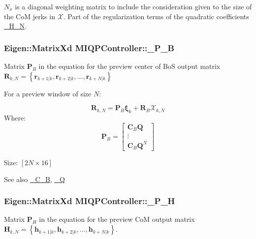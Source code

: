 $N_x$ is a diagonal weighting matrix to include the consideration given to the size of the \-Co\-M jerks in $\mathcal{X}$. \-Part of the regularization terms of the quadratic coefficients \hyperlink{classMIQPController_ab4b99d844add54fa7ad6ca6b80cab089}{\-\_\-\-H\-\_\-\-N}. \hypertarget{classMIQPController_a848852d659dff4a566a8dca57819587d}{
\subsubsection[{\-\_\-\-P\-\_\-\-B}]{\setlength{\rightskip}{0pt plus 5cm}\-Eigen\-::\-Matrix\-Xd {\bf \-M\-I\-Q\-P\-Controller\-::\-\_\-\-P\-\_\-\-B}}}\label{classMIQPController_a848852d659dff4a566a8dca57819587d}
\-Matrix $\mathbf{P}_B$ in the equation for the preview center of \-Bo\-S output matrix $\mathbf{R}_{k,N} = \left\{ \mathbf{r}_{k+1|k}, \mathbf{r}_{k+2|k}, \dots, \mathbf{r}_{k+N|k} \right\}$

\-For a preview window of size $N$\-:

\[ \mathbf{R}_{k,N} = \mathbf{P}_B \mathbf{\xi}_k + \mathbf{R}_B \mathcal{X}_{k,N} \] \-Where\-: \[ \mathbf{P}_B = \left[\begin{array}{c} \mathbf{C}_B \mathbf{Q} \\ \vdots\\ \mathbf{C}_B \mathbf{Q}^N \end{array}\right] \]

\-Size\-: $[2N\times16]$

\begin{DoxySeeAlso}{\-See also}
\hyperlink{classMIQPController_a5c6882cb248e9d16513868fea7835d6e}{\-\_\-\-C\-\_\-\-B}, \hyperlink{classMIQPController_ac6404f74d6002d6a0ca4bd2d0b41d548}{\-\_\-\-Q} 
\end{DoxySeeAlso}
\hypertarget{classMIQPController_afb83c4fddc4adba989506ccc9b62ff1e}{
\subsubsection[{\-\_\-\-P\-\_\-\-H}]{\setlength{\rightskip}{0pt plus 5cm}\-Eigen\-::\-Matrix\-Xd {\bf \-M\-I\-Q\-P\-Controller\-::\-\_\-\-P\-\_\-\-H}}}\label{classMIQPController_afb83c4fddc4adba989506ccc9b62ff1e}
\-Matrix $\mathbf{P}_H$ in the equation for the preview \-Co\-M output matrix $\mathbf{H}_{k,N} = \left\{ \mathbf{h}_{k+1|k}, \mathbf{h}_{k+2|k}, \dots, \mathbf{h}_{k+N|k} \right\}$.

